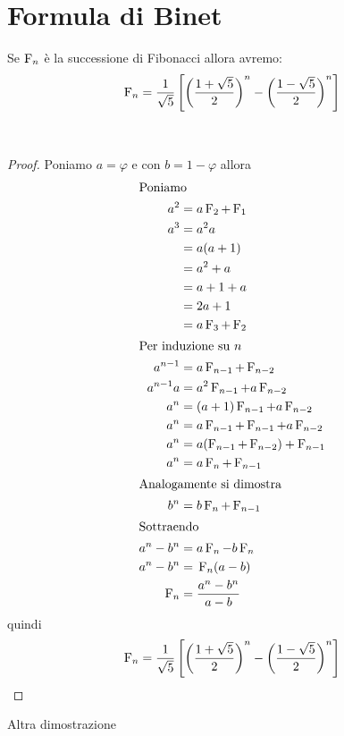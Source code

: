 \section{Formula di Binet}
\begin{thm}
	Se $\operatorname{F}_{n}$ è la successione di Fibonacci allora avremo:
	\begin{equation}
		\operatorname{F}_{n}=\dfrac{1}{\sqrt{5}}\left[\left(\dfrac{1+\sqrt{5}}{2}\right)^n-\left(\dfrac{1-\sqrt{5}}{2}\right)^n\right]
	\end{equation}\label{eqn:FinBinet}
\end{thm}~\cite{Conti2020}
\begin{proof}
	Poniamo $a=\varphi$ e con $b=1-\varphi$ allora
	\begin{align*}
		\intertext{Poniamo}
		a^2={}&a\operatorname{F}_{2}+\operatorname{F}_{1}\\
		a^3={}&a^2a\\
		={}&a(a+1)\\
		={}&a^2+a\\
		={}&a+1+a\\
		={}&2a+1\\
		={}&a\operatorname{F}_{3}+\operatorname{F}_{2}\\
		\intertext{Per induzione su $n$}
		a^{n-1}={}&a\operatorname{F}_{n-1}+\operatorname{F}_{n-2}\\
		a^{n-1}a={}&a^2\operatorname{F}_{n-1}+a\operatorname{F}_{n-2}\\
		a^{n}={}&(a+1)\operatorname{F}_{n-1}+a\operatorname{F}_{n-2}\\
		a^{n}={}&a\operatorname{F}_{n-1}+\operatorname{F}_{n-1}+a\operatorname{F}_{n-2}\\
		a^{n}={}&a(\operatorname{F}_{n-1}+\operatorname{F}_{n-2})+\operatorname{F}_{n-1}\\
		a^{n}={}&a\operatorname{F}_{n}+\operatorname{F}_{n-1}\\
		\intertext{Analogamente si dimostra}
		b^{n}={}&b\operatorname{F}_{n}+\operatorname{F}_{n-1}\\
		\intertext{Sottraendo}
		a^n-b^n={}&a\operatorname{F}_{n}-b\operatorname{F}_{n}\\
		a^n-b^n={}&\operatorname{F}_{n}(a-b)\\
		\operatorname{F}_{n}={}&\dfrac{a^n-b^n}{a-b}
	\end{align*}
quindi
\begin{equation}
\operatorname{F}_{n}=\dfrac{1}{\sqrt{5}}\left[\left(\dfrac{1+\sqrt{5}}{2}\right)^n-\left(\dfrac{1-\sqrt{5}}{2}\right)^n\right]
\end{equation}
\end{proof}
Altra dimostrazione
